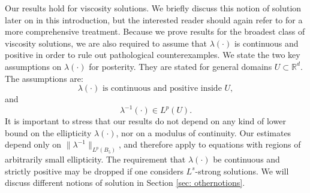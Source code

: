 \documentclass[reqno]{amsart}
\numberwithin{equation}{section}
\numberwithin{equation}{section}
\newcommand{\R}{\mathbb R}
\begin{document}
Our results hold for viscosity solutions. We briefly discuss this notion of solution later on in this introduction, but the interested reader should again refer to \cite{CaffarelliCabre1995} for a more comprehensive treatment. Because we prove results for the broadest class of viscosity solutions, we are also required to assume that $\lambda(\cdot)$ is continuous and positive in order to rule out pathological counterexamples. We state the two key assumptions on $\lambda(\cdot)$ for posterity. They are stated for general domains $U\subset \R^d$. The assumptions are:
\begin{equation}
    \label{eq: structuralassumption}
    \lambda(\cdot) \text{ is continuous and positive inside } U,
\end{equation}
and
\begin{equation}
    \label{eq: keyassumption}
    \lambda^{-1}(\cdot) \in L^p(U).
\end{equation}
It is important to stress that our results do not depend on any kind of lower bound on the ellipticity $\lambda(\cdot)$, nor on a modulus of continuity. Our estimates depend only on $\|\lambda^{-1}\|_{L^p(B_5)}$, and therefore apply to equations with regions of arbitrarily small ellipticity. The requirement that $\lambda(\cdot)$ be continuous and strictly positive may be dropped if one considers $L^s$-strong solutions. We will discuss different notions of solution in Section \ref{sec: othernotions}. 
\end{document}
